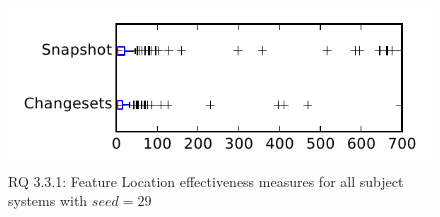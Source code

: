 
\begin{figure}
\centering
\includegraphics[height=0.4\textheight]{figures/flt_seed/rq1_tiny_29}
\caption{RQ 3.3.1: Feature Location effectiveness measures for all subject systems with $seed=29$}
\label{fig:flt_seed:rq1:tiny}
\end{figure}
